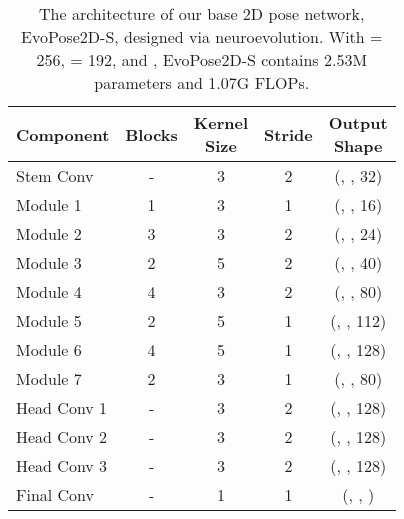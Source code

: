 \documentclass[final]{cvpr}
\begin{document}
\begin{table}
	\footnotesize
	\centering
	\renewcommand\arraystretch{1.3}
	\begin{tabular}{l|c|c|c|c}
		\hline
		Component & Blocks & \makecell{Kernel\\Size} & Stride & \makecell{Output\\Shape}\\
		\hline
		Stem Conv & - & 3 & 2 & (, , 32)\\
		\hline
		Module 1 & 1 & 3 & 1 & (, , 16)\\
		Module 2 & 3 & 3 & 2 & (, , 24)\\
		Module 3 & 2 & 5 & 2 & (, , 40)\\
		Module 4 & 4 & 3 & 2 & (, , 80)\\
		Module 5 & 2 & 5 & 1 & (, , 112)\\
		Module 6 & 4 & 5 & 1 & (, , 128)\\
		Module 7 & 2 & 3 & 1 & (, , 80)\\
		\hline
		Head Conv 1 & - & 3 & 2 & (, , 128)\\
		Head Conv 2 & - & 3 & 2 & (, , 128)\\
		Head Conv 3 & - & 3 & 2 & (, , 128)\\
		\hline
		Final Conv & - & 1 & 1 & (, , )\\
		\hline
	\end{tabular}
\vspace{2pt}
\caption{The architecture of our base 2D pose network, EvoPose2D-S, designed via neuroevolution. With  = 256,  = 192, and , EvoPose2D-S contains 2.53M parameters and 1.07G FLOPs.}
\vspace{-8pt}
\label{tab:evopose2d-s}
\end{table}
\end{document}
